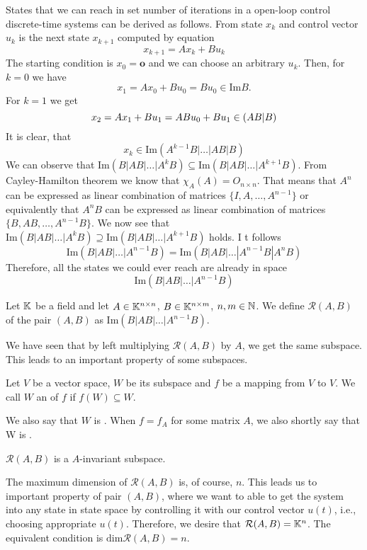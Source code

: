 States that we can reach in set number of iterations in a open-loop control discrete-time systems can be derived as follows. From state $x_k$ and control vector $u_k$ is the next state $x_{k+1}$ computed by equation
$$x_{k+1}=Ax_k+Bu_k$$
The starting condition is $x_0=\textbf{o}$ and we can choose an arbitrary $u_k$. Then, for $k=0$ we have $$x_1=Ax_0+Bu_0=Bu_0 \in \text{Im}B.$$ For $k=1$ we get
$$x_2=Ax_1+Bu_1=ABu_0+Bu_1\in\text(AB|B)$$
It is clear, that
$$x_k\in\text{Im}(A^{k-1}B|\ldots|AB|B)$$
We can observe that $\text{Im}(B|AB|\ldots|A^kB) \subseteq \text{Im}(B|AB|\ldots|A^{k+1}B)$. From Cayley-Hamilton theorem we know that $\chi_A(A)=O_{n\times n}$. That means that $A^n$ can be expressed as linear combination of matrices $\{I,A,\ldots,A^{n-1}\}$ or equivalently that $A^nB$ can be expressed as linear combination of matrices $\{B,AB,\ldots,A^{n-1}B\}$. We now see that $\text{Im}(B|AB|\ldots|A^kB) \supseteq \text{Im}(B|AB|\ldots|A^{k+1}B)$ holds. I t follows
$$\text{Im}(B|AB|\ldots|A^{n-1}B)=\text{Im}(B|AB|\ldots|A^{n-1}B|A^nB)$$
Therefore, all the states we could ever reach are already in space
$$\text{Im}(B|AB|\ldots|A^{n-1}B)$$

\begin{definition}
	Let $\mathbb{K}$ be a field and let $A \in \mathbb{K}^{n \times n}$, $B \in \mathbb{K}^{n \times m}$, $n,m \in \mathbb{N}$. We define  $\mathcal{R}(A,B)$ of the pair $(A,B)$ as $\text{Im}(B|AB|\ldots|A^{n-1}B)$.
\end{definition}

We have seen that by left multiplying $\mathcal{R}(A,B)$ by $A$, we get the same subspace. This leads to an important property of some subspaces.

\begin{definition}
	Let $V$ be a vector space, $W$ be its subspace and $f$ be a mapping from $V$ to $V$. We call $W$ an  of $f$ if $f(W)\subseteq W$.

	We also say that $W$ is . When $f=f_A$ for some matrix $A$, we also shortly say that W is .
\end{definition}

\begin{remark}
	\label{rem:reachinv}
	$\mathcal{R}(A,B)$ is a $A$-invariant subspace.
\end{remark} 

The maximum dimension of $\mathcal{R}(A,B)$ is, of course, $n$. This leads us to important property of pair $(A,B)$, where we want to able to get the system into any state in state space by controlling it with our control vector $u(t)$, i.e., choosing appropriate $u(t)$. Therefore, we desire that $\mathcal{R}(A,B)=\mathbb{K}^n$. The equivalent condition is $\text{dim}\mathcal{R}(A,B)=n$.

